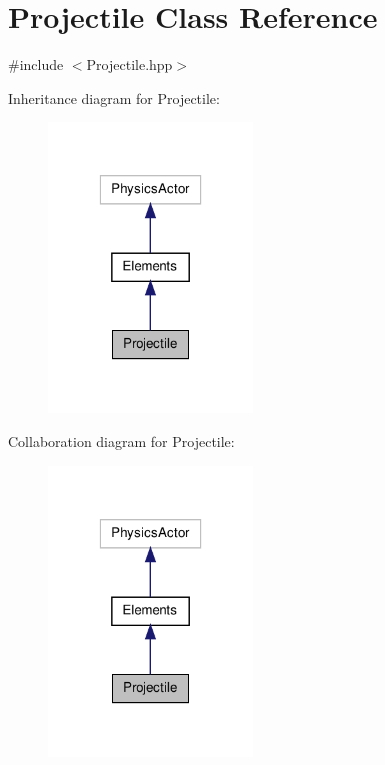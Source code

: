 \hypertarget{class_projectile}{\section{Projectile Class Reference}
\label{class_projectile}
}


{\ttfamily \#include $<$Projectile.\-hpp$>$}



Inheritance diagram for Projectile\-:
\nopagebreak
\begin{figure}[H]
\begin{center}
\leavevmode
\includegraphics[width=154pt]{class_projectile__inherit__graph}
\end{center}
\end{figure}


Collaboration diagram for Projectile\-:
\nopagebreak
\begin{figure}[H]
\begin{center}
\leavevmode
\includegraphics[width=154pt]{class_projectile__coll__graph}
\end{center}
\end{figure}

